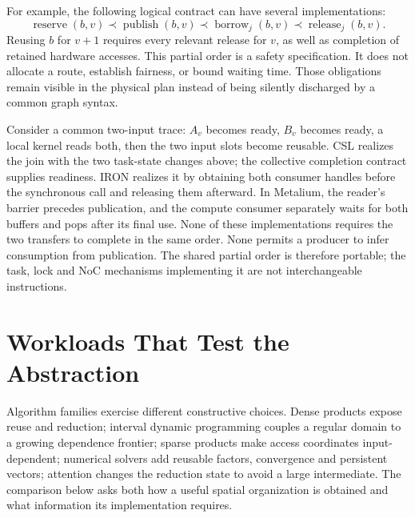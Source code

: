 \documentclass[final,3p,times,authoryear]{elsarticle}
\newcommand{\hb}{\mathrel{\prec}}
\begin{document}
For example, the following logical contract can have several implementations:
\begin{equation}\label{eq:borrow}
 \operatorname{reserve}(b,v)\hb\operatorname{publish}(b,v)
 \hb\operatorname{borrow}_j(b,v)\hb\operatorname{release}_j(b,v).
\end{equation}
Reusing $b$ for $v+1$ requires every relevant release for $v$, as well as completion of retained hardware accesses. This partial order is a safety specification. It does not allocate a route, establish fairness, or bound waiting time. Those obligations remain visible in the physical plan instead of being silently discharged by a common graph syntax.

Consider a common two-input trace: $A_v$ becomes ready, $B_v$ becomes ready, a local kernel reads both, then the two input slots become reusable. CSL realizes the join with the two task-state changes above; the collective completion contract supplies readiness. IRON realizes it by obtaining both consumer handles before the synchronous call and releasing them afterward. In Metalium, the reader's barrier precedes publication, and the compute consumer separately waits for both buffers and pops after its final use. None of these implementations requires the two transfers to complete in the same order. None permits a producer to infer consumption from publication. The shared partial order is therefore portable; the task, lock and NoC mechanisms implementing it are not interchangeable instructions.


\section{Workloads That Test the Abstraction}\label{sec:applications}
Algorithm families exercise different constructive choices. Dense products expose reuse and reduction; interval dynamic programming couples a regular domain to a growing dependence frontier; sparse products make access coordinates input-dependent; numerical solvers add reusable factors, convergence and persistent vectors; attention changes the reduction state to avoid a large intermediate. The comparison below asks both how a useful spatial organization is obtained and what information its implementation requires.
\end{document}
